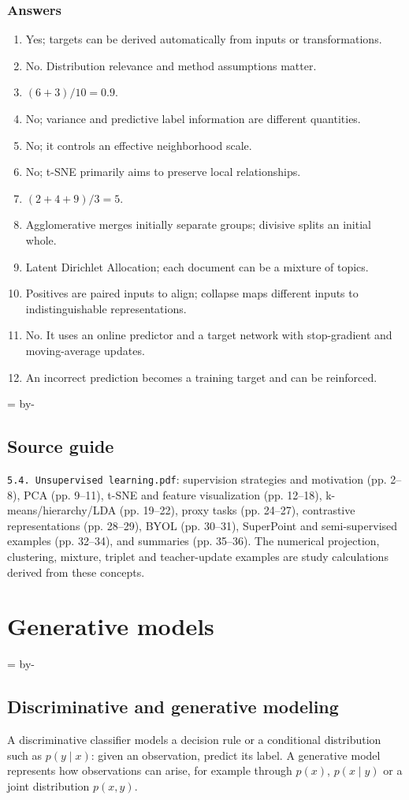 \documentclass[11pt]{article}
\newcommand{\newsubsection}[1]{\par\begingroup\skip0=\pagegoal\advance\skip0 by-\pagetotal\ifdim\skip0<12\baselineskip\newpage\fi\endgroup\subsection{#1}}
\begin{document}
\subsubsection{Answers}
\begin{enumerate}
\item Yes; targets can be derived automatically from inputs or transformations.
\item No. Distribution relevance and method assumptions matter.
\item $(6+3)/10=0.9$.
\item No; variance and predictive label information are different quantities.
\item No; it controls an effective neighborhood scale.
\item No; t-SNE primarily aims to preserve local relationships.
\item $(2+4+9)/3=5$.
\item Agglomerative merges initially separate groups; divisive splits an initial whole.
\item Latent Dirichlet Allocation; each document can be a mixture of topics.
\item Positives are paired inputs to align; collapse maps different inputs to indistinguishable representations.
\item No. It uses an online predictor and a target network with stop-gradient and moving-average updates.
\item An incorrect prediction becomes a training target and can be reinforced.
\end{enumerate}

\newsubsection{Source guide}
\texttt{5.4. Unsupervised learning.pdf}: supervision strategies and motivation (pp. 2--8), PCA (pp. 9--11), t-SNE and feature visualization (pp. 12--18), k-means/hierarchy/LDA (pp. 19--22), proxy tasks (pp. 24--27), contrastive representations (pp. 28--29), BYOL (pp. 30--31), SuperPoint and semi-supervised examples (pp. 32--34), and summaries (pp. 35--36). The numerical projection, clustering, mixture, triplet and teacher-update examples are study calculations derived from these concepts.


\clearpage
\section{Generative models}

\newsubsection{Discriminative and generative modeling}
A discriminative classifier models a decision rule or a conditional distribution such as $p(y\mid x)$: given an observation, predict its label. A generative model represents how observations can arise, for example through $p(x)$, $p(x\mid y)$ or a joint distribution $p(x,y)$.
\end{document}
